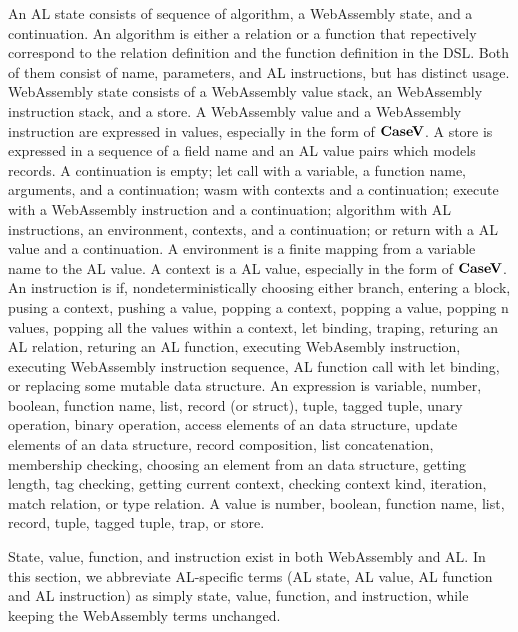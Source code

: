 An AL state consists of sequence of algorithm, a WebAssembly state, and a
continuation.
An algorithm is either a relation or a function that repectively correspond to
the relation definition and the function definition in the DSL.
Both of them consist of name, parameters, and AL instructions, but has distinct
usage.
WebAssembly state consists of a WebAssembly value stack, an WebAssembly
instruction stack, and a store.
A WebAssembly value and a WebAssembly instruction are expressed in values,
especially in the form of $\textbf{CaseV}$.
A store is expressed in a sequence of a field name and an AL value pairs which
models records.
A continuation is empty; let call with a variable, a function name, arguments,
and a continuation; wasm with contexts and a continuation; execute with a
WebAssembly instruction and a continuation; algorithm with AL instructions, an
environment, contexts, and a continuation; or return with a AL value and a
continuation.
A environment is a finite mapping from a variable name to the AL value.
A context is a AL value, especially in the form of $\textbf{CaseV}$.
An instruction is if, nondeterministically choosing either branch, entering a
block, pusing a context, pushing a value, popping a context, popping a value,
popping n values, popping all the values within a context, let binding,
traping, returing an AL relation, returing an AL function, executing WebAsembly
instruction, executing WebAssembly instruction sequence, AL function call with
let binding, or replacing some mutable data structure.
An expression is variable, number, boolean, function name, list, record (or
struct), tuple, tagged tuple, unary operation, binary operation, access
elements of an data structure, update elements of an data structure, record
composition, list concatenation, membership checking, choosing an element from
an data structure, getting length, tag checking, getting current
context, checking context kind, iteration, match relation, or type relation.
A value is number, boolean, function name, list, record, tuple, tagged tuple,
trap, or store.


State, value, function, and instruction exist in both WebAssembly and AL. In
this section, we abbreviate AL-specific terms (AL state, AL value, AL function
and AL instruction) as simply state, value, function, and instruction, while
keeping the WebAssembly terms unchanged.




